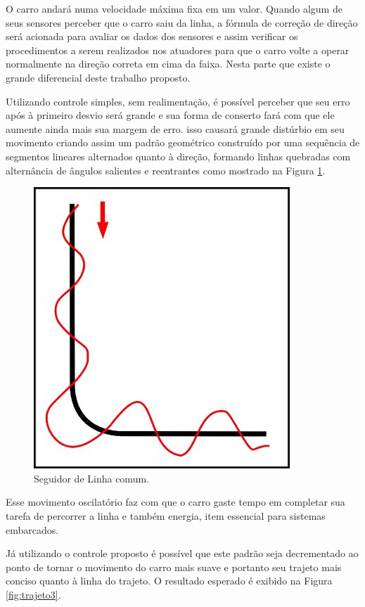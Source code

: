 \documentclass[portugues, brazil, a4paper,12pt]{article}
\begin{document}
	
		O carro andará numa velocidade máxima fixa em um valor. Quando algum de seus sensores perceber que o carro saiu da linha, a fórmula de correção de direção será acionada para avaliar os dados dos sensores e assim verificar os procedimentos a serem realizados nos atuadores para que o carro volte a operar normalmente na direção correta em cima da faixa. Nesta parte que existe o grande diferencial deste trabalho proposto.

		Utilizando controle simples, sem realimentação, é possível perceber que seu erro após à primeiro desvio será grande e sua forma de conserto fará com que ele aumente ainda mais sua margem de erro. isso causará grande distúrbio em seu movimento criando assim um padrão geométrico construído por uma sequência de segmentos lineares alternados quanto à direção, formando linhas quebradas com alternância de ângulos salientes e reentrantes como mostrado na Figura \ref{fig:trajeto2}.
		
		\begin{figure}[H]
			\centering
			\includegraphics[width=0.5\linewidth]{img/trajeto2.jpg}
			\caption{Seguidor de Linha comum.}
			\label{fig:trajeto2}
		\end{figure}
	
		Esse movimento oscilatório faz com que o carro gaste tempo em completar sua tarefa de percorrer a linha e também energia, item essencial para sistemas embarcados.
	
		Já utilizando o controle proposto é possível que este padrão seja decrementado ao ponto de tornar o movimento do carro mais suave e portanto seu trajeto mais conciso quanto à linha do trajeto. O resultado esperado é exibido na Figura \ref{fig:trajeto3}.
	
\end{document}
